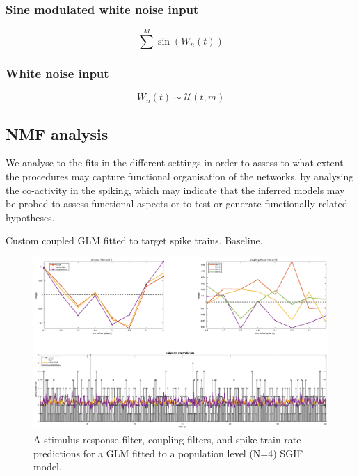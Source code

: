 \documentclass[mphil,deptreport,ianc]{infthesis} %
\begin{document}
\subsubsection*{Sine modulated white noise input}

\begin{equation}
    \sum^M \sin(W_n(t))
\end{equation}

\subsubsection*{White noise input}

\begin{equation}
    W_n(t) \sim \mathcal{U}(t, m)
\end{equation}



\subsection{NMF analysis}

We analyse to the fits in the different settings in order to assess to what extent the procedures may capture functional organisation of the networks, by analysing the co-activity in the spiking, which may indicate that the inferred models may be probed to assess functional aspects or to test or generate functionally related hypotheses.

Custom coupled GLM fitted to target spike trains. Baseline.

\begin{figure}
    \hspace{-0.1\columnwidth}
    \includegraphics[width=1.2\columnwidth]{figures/matlab/export_GLM_filters_pred_bin_size_0_1_cell_2_target_GT_model_mesoGIF_N_4.eps}
    \caption{A stimulus response filter, coupling filters, and spike train rate predictions for a GLM fitted to a population level (N=4) SGIF model.}
    \label{fig:GLM_mesoGIF}
\end{figure}
\end{document}
